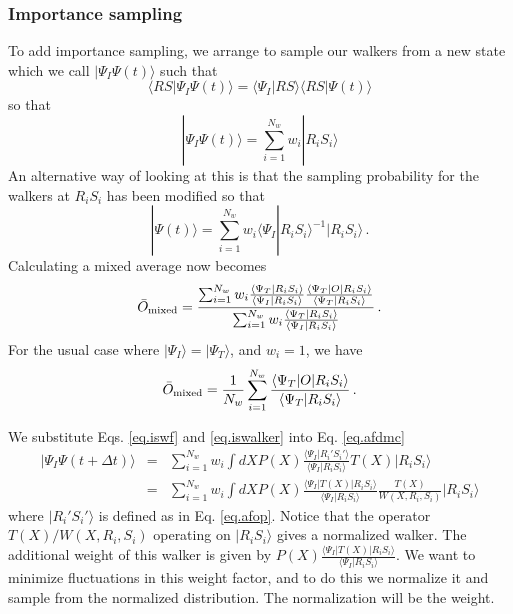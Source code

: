  \subsubsection{Importance sampling}
 To add importance sampling, we arrange to sample our walkers from
 a new state which we call $|\Psi_I \Psi(t)\rangle$ such that
 \begin{equation}
 \label{eq.iswf}
 \langle R S |\Psi_I\Psi(t)\rangle
 = \langle \Psi_I|RS\rangle \langle RS|\Psi(t)\rangle
 \end{equation}
 so that
 \begin{equation}
 \label{eq.iswalker}
 |\Psi_I \Psi(t)\rangle = \sum_{i=1}^{N_w} w_i |R_iS_i\rangle
 \end{equation}
 An alternative way of looking at this is that
 the sampling probability for the walkers at $R_iS_i$ has been
 modified so that
 \begin{equation}
 \label{eq.imp}
 |\Psi(t)\rangle = \sum_{i=1}^{N_w} w_i \langle \Psi_I|R_iS_i\rangle^{-1}
 |R_i S_i\rangle \,.
 \end{equation}
 Calculating a mixed average now becomes
 \begin{equation}
 \bar O_{\rm mixed} = \frac{\sum_{i=1}^{N_w} w_i
 	\frac{\langle \Psi_T|R_iS_i\rangle}{\langle \Psi_I|R_iS_i\rangle}
 	\frac{\langle \Psi_T|O|R_iS_i\rangle}{\langle \Psi_T|R_iS_i\rangle}}
 {\sum_{i=1}^{N_w} w_i
 	\frac{\langle \Psi_T|R_iS_i\rangle}{\langle \Psi_I|R_iS_i\rangle}
 } \,.
 \end{equation}
 For the usual case where $|\Psi_I\rangle = |\Psi_T\rangle$, and
 $w_i = 1$, we have
 \begin{equation}
 \bar O_{\rm mixed} = \frac{1}{N_w} \sum_{i=1}^{N_w}
 \frac{\langle \Psi_T|O|R_iS_i\rangle}{\langle \Psi_T|R_iS_i\rangle} \,.
 \end{equation}
 
 
 We substitute Eqs. \ref{eq.iswf} and \ref{eq.iswalker} into Eq. \ref{eq.afdmc}
 \begin{eqnarray}
 |\Psi_I \Psi(t+\Delta t)\rangle &=& \sum_{i=1}^{N_w} w_i
 \int dX P(X)
 \frac{\langle \Psi_I|R_i'S_i'\rangle}{\langle \Psi_I|R_iS_i\rangle}
 T(X)|R_i S_i\rangle
 \nonumber\\
 &=&
 \sum_{i=1}^{N_w} w_i
 \int dX P(X)
 \frac{\langle \Psi_I|T(X)|R_iS_i\rangle}{\langle \Psi_I|R_iS_i\rangle}
 \frac{T(X)}{W(X,R_i,S_i)}|R_i S_i\rangle
 \end{eqnarray}
 where $|R_i'S_i'\rangle$ is defined as in Eq. \ref{eq.afop}.
 Notice that the operator $T(X)/W(X,R_i,S_i)$ operating on $|R_iS_i\rangle$
 gives a normalized walker. The additional weight of this walker is given by
 $P(X)\frac{\langle \Psi_I|T(X)|R_iS_i\rangle}{\langle \Psi_I|R_iS_i\rangle}$.
 We want to minimize fluctuations in this weight factor, and to do this
 we normalize it and sample from the normalized distribution. The
 normalization will be the weight.
 
